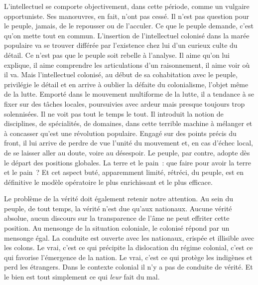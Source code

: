 \documentclass[french,twoside]{book} %
\begin{document}
L’intellectuel se comporte objectivement, dans cette période, comme un vulgaire opportuniste. Ses manœuvres, en fait, n’ont pas cessé. Il n’est pas question pour le peuple, jamais, de le repousser ou de l’acculer. Ce que le peuple demande, c’est qu’on mette tout en commun. L’insertion de l’intellectuel colonisé dans la marée populaire va se trouver différée par l’existence chez lui d’un curieux culte du détail. Ce n’est pas que le peuple soit rebelle à l’analyse. Il aime qu’on lui explique, il aime comprendre les articulations d’un raisonnement, il aime voir où il va. Mais l’intellectuel colonisé, au début de sa cohabitation avec le peuple, privilégie le détail et en arrive à oublier la défaite du colonialisme, l’objet même de la lutte. Emporté dans le mouvement multiforme de la lutte, il a tendance à se fixer sur des tâches locales, poursuivies avec ardeur mais presque toujours trop solennisées. Il ne voit pas tout le temps le tout. Il introduit la notion de disciplines, de spécialités, de   domaines, dans cette terrible machine à mélanger et à concasser qu’est une révolution populaire. Engagé sur des points précis du front, il lui arrive de perdre de vue l’unité du mouvement et, en cas d’échec local, de se laisser aller au doute, voire au désespoir. Le peuple, par contre, adopte dès le départ des positions globales. La terre et le pain : que faire pour avoir la terre et le pain ? Et cet aspect buté, apparemment limité, rétréci, du peuple, est en définitive le modèle opératoire le plus enrichissant et le plus efficace.\par
\bigbreak
\noindent Le problème de la vérité doit également retenir notre attention. Au sein du peuple, de tout temps, la vérité n’est due qu’aux nationaux. Aucune vérité absolue, aucun discours sur la transparence de l’âme ne peut effriter cette position. Au mensonge de la situation coloniale, le colonisé répond par un mensonge égal. La conduite est ouverte avec les nationaux, crispée et illisible avec les colons. Le vrai, c’est ce qui précipite la dislocation du régime colonial, c’est ce qui favorise l’émergence de la nation. Le vrai, c’est ce qui protège les indigènes et perd les étrangers. Dans le contexte colonial il n’y a pas de conduite de vérité. Et le bien est tout simplement ce qui \emph{leur} fait du mal.\par
\bigbreak
\end{document}

